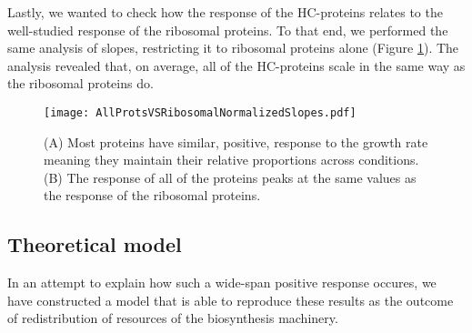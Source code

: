 \documentclass[notitlepage]{article}
\begin{document}
Lastly, we wanted to check how the response of the HC-proteins relates to the well-studied response of the ribosomal proteins.
To that end, we performed the same analysis of slopes, restricting it to ribosomal proteins alone (Figure \ref{fig:globalfit}).
The analysis revealed that, on average, all of the HC-proteins scale in the same way as the ribosomal proteins do.

\begin{figure}[h]
\centering
\texttt{[image: AllProtsVSRibosomalNormalizedSlopes.pdf]}
\caption{
    (A) Most proteins have similar, positive, response to the growth rate meaning they maintain their relative proportions across conditions.
    (B) The response of all of the proteins peaks at the same values as the response of the ribosomal proteins.
}
\label{fig:globalfit}
\end{figure}
\subsection{Theoretical model}
In an attempt to explain how such a wide-span positive response occures, we have constructed a model that is able to reproduce these results as the outcome of redistribution of resources of the biosynthesis machinery.
\end{document}
